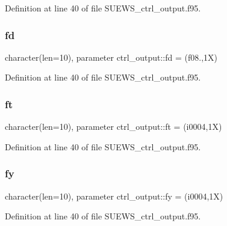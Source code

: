 Definition at line 40 of file S\+U\+E\+W\+S\+\_\+ctrl\+\_\+output.\+f95.

\mbox{\label{namespacectrl__output_aa27783daf4b75a43cae98a60ce884744}} 
\subsubsection{\texorpdfstring{fd}{fd}}
{\footnotesize\ttfamily character(len=10), parameter ctrl\+\_\+output\+::fd = \textquotesingle{}(f08.,1\+X)\textquotesingle{}}



Definition at line 40 of file S\+U\+E\+W\+S\+\_\+ctrl\+\_\+output.\+f95.

\mbox{\label{namespacectrl__output_a2b5a74f7a69e74fed45533d69b5fcf81}} 
\subsubsection{\texorpdfstring{ft}{ft}}
{\footnotesize\ttfamily character(len=10), parameter ctrl\+\_\+output\+::ft = \textquotesingle{}(i0004,1\+X)\textquotesingle{}}



Definition at line 40 of file S\+U\+E\+W\+S\+\_\+ctrl\+\_\+output.\+f95.

\mbox{\label{namespacectrl__output_a250aeaca42269ac3898762523ec86e22}} 
\subsubsection{\texorpdfstring{fy}{fy}}
{\footnotesize\ttfamily character(len=10), parameter ctrl\+\_\+output\+::fy = \textquotesingle{}(i0004,1\+X)\textquotesingle{}}



Definition at line 40 of file S\+U\+E\+W\+S\+\_\+ctrl\+\_\+output.\+f95.

\mbox{\label{namespacectrl__output_a0e436b9299ebba225dbe6a2f4eff2eed}} 
